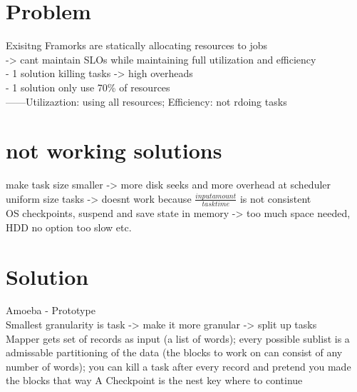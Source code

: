 \documentclass[a4paper]{article}
\begin{document}
\section{Problem}
Exisitng Framorks are statically allocating resources to jobs\\
-> cant maintain SLOs while maintaining full utilization and efficiency\\
- 1 solution killing tasks -> high overheads\\
- 1 solution only use 70\% of resources\\
------Utilizaztion: using all resources; Efficiency: not rdoing tasks\\

\section{not working solutions}
make task size smaller -> more disk seeks and more overhead at scheduler\\
uniform size tasks -> doesnt work because $\frac{input amount}{task time}$ is not consistent\\
OS checkpoints, suspend and save state in memory -> too much space needed, HDD no option too slow etc.\\

\section{Solution}
Amoeba - Prototype\\
Smallest granularity is task -> make it more granular -> split up tasks\\
Mapper gets set of records as input (a list of words); every possible sublist is a admissable partitioning of the data (the blocks to work on can consist of any number of words); you can kill a task after every record and pretend you made the blocks that way
A Checkpoint is the nest key where to continue
\end{document}
